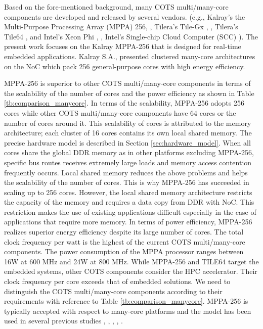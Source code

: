 \documentclass[conference,compsoc]{IEEEtran}
\begin{document}
Based on the fore-mentioned background, many COTS multi/many-core components are developed and released by several vendors.
(e.g., Kalray's the Multi-Purpose Processing Array (MPPA) 256, \cite{de2014time}, Tilera's Tile-Gx \cite{schooler2010tile}, \cite{ramey2011tile}, Tilera's Tile64 \cite{bell2008tile64}, and Intel's Xeon Phi \cite{chrysos2014intel}, \cite{chrysos2012intel}, Intel's Single-chip Cloud Computer (SCC) \cite{baron2010single}).
The present work focuses on the Kalray MPPA-256 that is designed for real-time embedded applications.
Kalray S.A., \cite{de2014time} presented clustered many-core architectures on the NoC which pack 256 general-purpose cores with high energy efficiency.

MPPA-256 is superior to other COTS multi/many-core components in terms of the scalability of the number of cores and the power efficiency as shown in Table \ref{tb:comparison_manycore}.
In terms of the scalability, MPPA-256 adopts 256 cores while other COTS multi/many-core components have 64 cores or the number of cores around it.
This scalability of cores is attributed to the memory architecture; each cluster of 16 cores contains its own local shared memory.
The precise hardware model is described in Section \ref{sec:hardware_model}.
When all cores share the global DDR memory as in other platforms excluding MPPA-256, specific bus routes receives extremely large loads and memory access contention frequently occurs.
Local shared memory reduces the above problems and helps the scalability of the number of cores.
This is why MPPA-256 has succeeded in scaling up to 256 cores.
However, the local shared memory architecture restricts the capacity of the memory and requires a data copy from DDR with NoC.
This restriction makes the use of existing applications difficult especially in the case of applications that require more memory.
In terms of power efficiency, MPPA-256 realizes superior energy efficiency despite its large number of cores.
The total clock frequency per watt is the highest of the current COTS multi/many-core components.
The power consumption of the MPPA processor ranges between 16W at 600 MHz and 24W at 800 MHz.
While MPPA-256 and TILE64 \cite{bell2008tile64} target the embedded systems, other COTS components consider the HPC accelerator.
Their clock frequency per core exceeds that of embedded solutions.
We need to distinguish the COTS multi/many-core components according to their requirements with reference to Table \ref{tb:comparison_manycore}.
MPPA-256 is typically accepted with respect to many-core platforms and the model has been used in several previous studies \cite{perret2016temporal}, \cite{becker2016contention}, \cite{carle2014static}, \cite{perret2016mapping}, \cite{perret2016predictable}.
\end{document}
